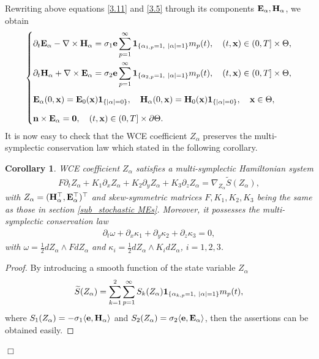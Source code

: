 \documentclass[preprint,12pt]{article}
\newtheorem{proof}{Proof}
\newtheorem{cor}{Corollary}
\numberwithin{figure}{section}
\numberwithin{table}{section}
\numberwithin{equation}{section}
\begin{document}
Rewriting above equations \eqref{3.11} and \eqref{3.5} through its components ${\bf E}_\alpha,{\bf H}_{\alpha}$, we obtain
\begin{equation}\label{3.6}
\left \{	
\begin{split}
		&\partial_t{\bf E}_\alpha-\nabla\times{\bf H}_\alpha=\sigma_{1}{\bf{e}}\sum_{p=1}^{\infty}{\bf 1}_{\{\alpha_{1,p}=1,~|\alpha|=1\}}m_p(t),\quad (t,{\bf x})\in(0,T]\times\Theta,\\
		&\partial_t{\bf H}_\alpha+\nabla\times{\bf E}_\alpha=\sigma_{2}{\bf{e}}\sum_{p=1}^{\infty}{\bf 1}_{\{\alpha_{2,p}=1,~|\alpha|=1\}}m_p(t),\quad (t,{\bf x})\in(0,T]\times\Theta,\\[1.5mm]
		&{\bf E}_\alpha(0,{\bf x})={\bf E}_0({\bf x}){\bf 1}_{\{|\alpha|=0\}},\quad{\bf H}_\alpha(0,{\bf x})={\bf H}_0({\bf x}){\bf 1}_{\{|\alpha|=0\}},\quad {\bf x}\in\Theta,\\[2.5mm]
		&{\bf n}\times{\bf E}_\alpha={\bf 0},\quad (t,{\bf x})\in(0,T]\times\partial\Theta.
	\end{split}
\right.
\end{equation}
It is now easy to check that the WCE coefficient $Z_\alpha$ preserves the multi-symplectic conservation law which stated in the following corollary.
\begin{cor}
WCE coefficient $Z_\alpha$ satisfies a multi-symplectic Hamiltonian system
  \begin{align*}
    F\partial_tZ_{\alpha}+K_1\partial_xZ_{\alpha}+K_2\partial_yZ_{\alpha}+K_3\partial_zZ_{\alpha}=\nabla_{Z_{\alpha}}\tilde{S}(Z_{\alpha}),
  \end{align*}
  with $Z_{\alpha}=({\bf H}_{\alpha}^\top,{\bf E}_{\alpha}^\top)^\top$ and skew-symmetric matrices $F,K_1,K_2,K_3$ being the same as those in section \ref{sub_stochastic MEs}. Moreover, it possesses the multi-symplectic conservation law
  \begin{align*}
 \partial_t\omega+\partial_x\kappa_1+\partial_y\kappa_2+\partial_z\kappa_3=0,
  \end{align*}
  with $\omega=\frac12dZ_{\alpha}\wedge FdZ_{\alpha}$ and $\kappa_{i}=\frac12dZ_{\alpha}\wedge K_idZ_{\alpha}$, $i=1,2,3$.
\end{cor}
\begin{proof}
 By introducing a smooth function of the state variable $Z_{\alpha}$ $$\widetilde{S}(Z_{\alpha})=\sum_{k=1}^2\sum_{p=1}^{\infty} S_{k}(Z_{\alpha}){\bf 1}_{\{\alpha_{k,p}=1,~|\alpha|=1\}}m_p(t),$$
 where $S_{1}(Z_\alpha)=-\sigma_{1}\langle{\bf e},{\bf H}_{\alpha}\rangle$ and $S_{2}(Z_\alpha)=\sigma_{2}\langle{\bf e},{\bf E}_{\alpha}\rangle$, then the  assertions can be obtained easily.
\end{proof}
\hfill $\Box$
\end{document}
